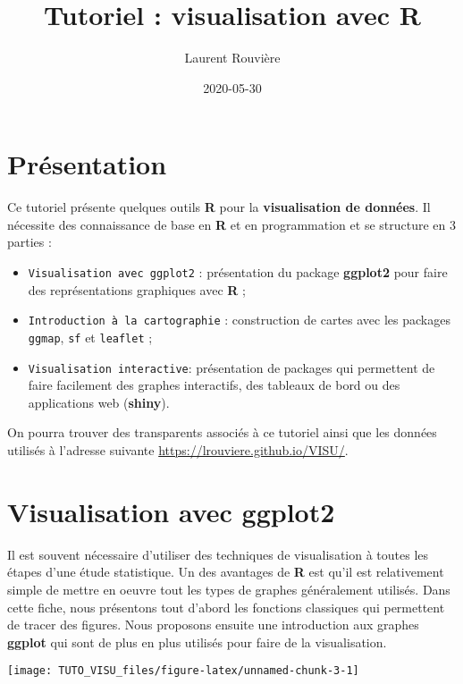 \documentclass[]{article}
\title{Tutoriel : visualisation avec R}
\author{Laurent Rouvière}
\date{2020-05-30}
\providecommand{\tightlist}{%
  \setlength{\itemsep}{0pt}\setlength{\parskip}{0pt}}
\theoremstyle{definition}
\theoremstyle{definition}
\theoremstyle{definition}
\theoremstyle{remark}
\begin{document}
\maketitle

{
\setcounter{tocdepth}{2}
\tableofcontents
}
\hypertarget{Presentation}{%
\section*{Présentation}\label{Presentation}}

Ce tutoriel présente quelques outils \textbf{R} pour la \textbf{visualisation de données}. Il nécessite des connaissance de base en \textbf{R} et en programmation et se structure en 3 parties :

\begin{itemize}
\tightlist
\item
  \texttt{Visualisation\ avec\ ggplot2} : présentation du package \textbf{ggplot2} pour faire des représentations graphiques avec \textbf{R} ;
\item
  \texttt{Introduction\ à\ la\ cartographie} : construction de cartes avec les packages \texttt{ggmap}, \texttt{sf} et \texttt{leaflet} ;
\item
  \texttt{Visualisation\ interactive}: présentation de packages qui permettent de faire facilement des graphes interactifs, des tableaux de bord ou des applications web (\textbf{shiny}).
\end{itemize}

On pourra trouver des transparents associés à ce tutoriel ainsi que les données utilisés à l'adresse suivante \url{https://lrouviere.github.io/VISU/}.

\hypertarget{ggplot2}{%
\section{Visualisation avec ggplot2}\label{ggplot2}}

Il est souvent nécessaire d'utiliser des techniques de visualisation à toutes les étapes d'une étude statistique. Un des avantages de \textbf{R} est qu'il est relativement simple de mettre en oeuvre tout les types de graphes généralement utilisés. Dans cette fiche, nous présentons tout d'abord les fonctions classiques qui permettent de tracer des figures. Nous proposons ensuite une introduction aux graphes \textbf{ggplot} qui sont de plus en plus utilisés pour faire de la visualisation.

\begin{center}\texttt{[image: TUTO\_VISU\_files/figure-latex/unnamed-chunk-3-1]} \end{center}
\end{document}
